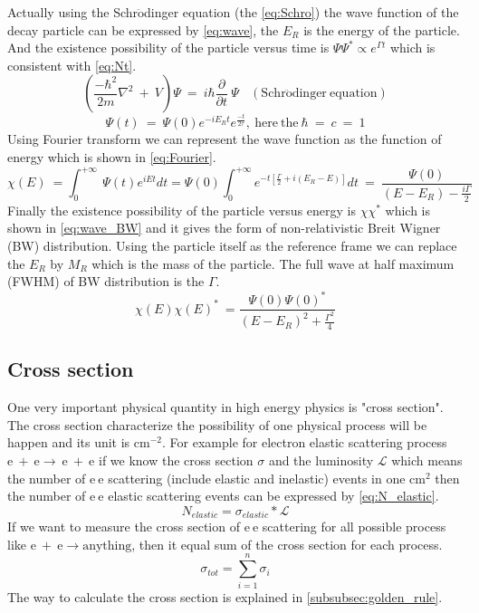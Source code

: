 Actually using the Schr$\mathrm{\ddot{o}}$dinger equation (the \ref{eq:Schro}) the wave function of the decay particle can be expressed by \ref{eq:wave}, the $E_{R}$ is the energy of the particle. And the existence possibility of the particle versus time is $\Psi\Psi^{\ast}\varpropto e^{\Gamma t}$ which is consistent with \ref{eq:Nt}.
\begin{equation}
(\frac{-\hbar^{2}}{2m}\nabla^{2}~+~ V)\Psi~=~i\hbar\frac{\partial}{\partial t}~\Psi ~~~~(\mathrm{Schr\ddot{o}dinger~equation})
\label{eq:Schro}
\end{equation}
\begin{equation}
\Psi(t)~=~\Psi(0)e^{-iE_{R}t}e^{\frac{-t}{2\tau}},~\mathrm{here~the}~\hbar~=~c~=~1
\label{eq:wave}
\end{equation}
Using Fourier transform we can represent the wave function as the function of energy which is shown in \ref{eq:Fourier}.
\begin{equation}
\chi(E)~=\int_{0}^{+\infty}~\Psi(t)e^{iEt}dt=\Psi(0)\int_{0}^{+\infty}e^{-t[\frac{\Gamma}{2}+i(E_{R}-E)]}dt~=~\frac{\Psi(0)}{(E-E_{R})-\frac{i\Gamma}{2}}
\label{eq:Fourier}
\end{equation}
Finally the existence possibility of the particle versus energy is $\chi\chi^{\ast}$ which is shown in \ref{eq:wave_BW} and it gives the form of non-relativistic Breit Wigner (BW) distribution. Using the particle itself as the reference frame we can replace the $E_{R}$ by $M_{R}$ which is the mass of the particle. The full wave at half maximum (FWHM) of BW distribution is the $\Gamma$.
\begin{equation}
\chi(E)\chi(E)^{\ast}~=\frac{\Psi(0)\Psi(0)^{\ast}}{(E-E_{R})^{2}+\frac{\Gamma^{2}}{4}}
\label{eq:wave_BW}
\end{equation}
\subsection{Cross section}\label{subsubsec:Cross_section}
One very important physical quantity in high energy physics is "cross section". The cross section characterize the possibility of one physical process will be happen and its unit is $\mathrm{cm^{-2}}$. For example for electron elastic scattering process $\mathrm{e~+~e\rightarrow~e~+~e}$ if we know the cross section $\sigma$ and the luminosity $\mathcal{L}$ which means the number of $\mathrm{e~e}$ scattering (include elastic and inelastic) events in one $\mathrm{cm^{2}}$ then the number of $\mathrm{e~e}$ elastic scattering events can be expressed by \ref{eq:N_elastic}.
\begin{equation}
N_{elastic}=\sigma_{elastic}*\mathcal{L}
\label{eq:N_elastic}
\end{equation}
If we want to measure the cross section of $\mathrm{e~e}$ scattering for all possible process like $\mathrm{e~+~e\rightarrow anything}$, then it equal sum of the cross section for each process.
\begin{equation}
\sigma_{tot}=\sum_{i=1}^{n}\sigma_{i}
\label{eq:sigma_tot}
\end{equation}
The way to calculate the cross section is explained in \ref{subsubsec:golden_rule}.
